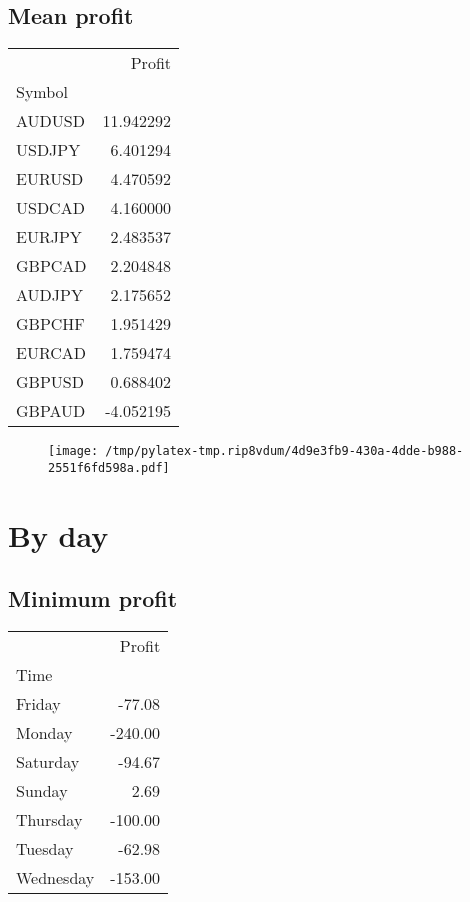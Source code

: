 \documentclass{article}%
\begin{document}
%
\newpage %
\subsection{Mean profit }%
\label{subsec:Meanprofit}%
\begin{tabular}{lr}
\toprule
{} &     Profit \\
Symbol &            \\
\midrule
AUDUSD &  11.942292 \\
USDJPY &   6.401294 \\
EURUSD &   4.470592 \\
USDCAD &   4.160000 \\
EURJPY &   2.483537 \\
GBPCAD &   2.204848 \\
AUDJPY &   2.175652 \\
GBPCHF &   1.951429 \\
EURCAD &   1.759474 \\
GBPUSD &   0.688402 \\
GBPAUD &  -4.052195 \\
\bottomrule
\end{tabular}
%


\begin{figure}[htbp]%
\centering%
\texttt{[image: /tmp/pylatex-tmp.rip8vdum/4d9e3fb9-430a-4dde-b988-2551f6fd598a.pdf]}%
\end{figure}

%
\newpage %
\section{By day}%
\label{sec:Byday}%
\subsection{Minimum profit }%
\label{subsec:Minimumprofit}%
\begin{tabular}{lr}
\toprule
{} &  Profit \\
Time      &         \\
\midrule
Friday    &  -77.08 \\
Monday    & -240.00 \\
Saturday  &  -94.67 \\
Sunday    &    2.69 \\
Thursday  & -100.00 \\
Tuesday   &  -62.98 \\
Wednesday & -153.00 \\
\bottomrule
\end{tabular}
%
\end{document}
